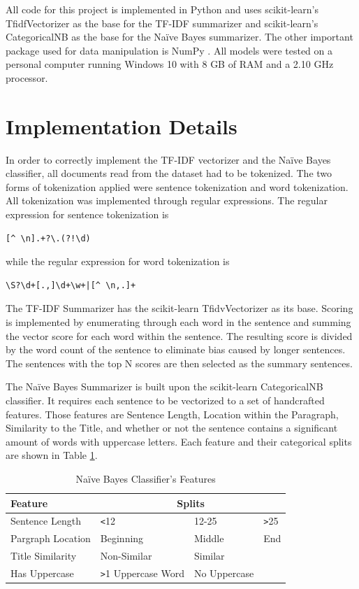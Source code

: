 \documentclass{IEEEtran}
\begin{document}
All code for this project is implemented in Python and uses scikit-learn's TfidfVectorizer \cite{scikit-learn_tf-idf} as the base for the TF-IDF summarizer and scikit-learn's CategoricalNB \cite{scikit-learn_naive_bayes} as the base for the Na\"{i}ve Bayes summarizer. The other important package used for data manipulation is NumPy \cite{numpy}. All models were tested on a personal computer running Windows 10 with 8 GB of RAM and a 2.10 GHz processor. 

\section{Implementation Details}
In order to correctly implement the TF-IDF vectorizer and the Na\"{i}ve Bayes classifier, all documents read from the dataset had to be tokenized. The two forms of tokenization applied were sentence tokenization and word tokenization. All tokenization was implemented through regular expressions. The regular expression for sentence tokenization is
\begin{verbatim}
[^ \n].+?\.(?!\d)
\end{verbatim}
while the regular expression for word tokenization is
\begin{verbatim}
\S?\d+[.,]\d+\w+|[^ \n,.]+
\end{verbatim}

The TF-IDF Summarizer has the scikit-learn TfidvVectorizer \cite{scikit-learn_tf-idf} as its base. Scoring is implemented by enumerating through each word in the sentence and summing the vector score for each word within the sentence. The resulting score is divided by the word count of the sentence to eliminate bias caused by longer sentences. The sentences with the top N scores are then selected as the summary sentences.

The Na\"{i}ve Bayes Summarizer is built upon the scikit-learn CategoricalNB \cite{scikit-learn_naive_bayes} classifier. It requires each sentence to be vectorized to a set of handcrafted features. Those features are Sentence Length, Location within the Paragraph, Similarity to the Title, and whether or not the sentence contains a significant amount of words with uppercase letters. Each feature and their categorical splits are shown in Table \ref{table:nb_features}.

\begin{table}[h]
\centering
\caption{Na\"{i}ve Bayes Classifier's Features}
\begin{tabular}{|l|l|l|l|}
\hline
Feature  & \multicolumn{3}{|c|}{Splits} \\ \hline
Sentence Length  & \verb|<|12  & 12-25  & \verb|>|25 \\ \hline
Pargraph Location  & Beginning  & Middle  & End \\ \hline
Title Similarity  & Non-Similar  & Similar  & \\ \hline
Has Uppercase  & \verb|>|1 Uppercase Word  & No Uppercase & \\ \hline
\end{tabular}
\label{table:nb_features}
\end{table}
\end{document}
